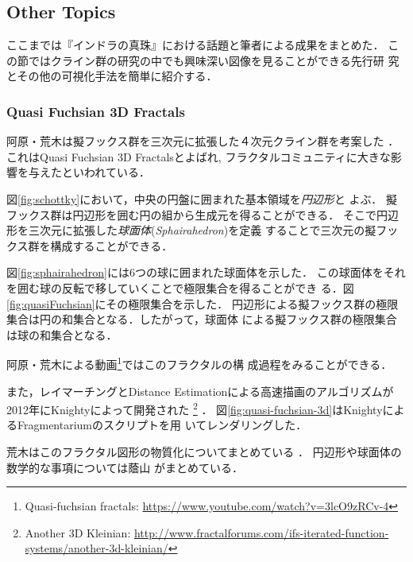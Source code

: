 \subsection{Other Topics}

ここまでは『インドラの真珠』における話題と筆者による成果をまとめた．
この節ではクライン群の研究の中でも興味深い図像を見ることができる先行研
究とその他の可視化手法を簡単に紹介する．

\subsubsection{Quasi Fuchsian 3D Fractals}

阿原・荒木は擬フックス群を三次元に拡張した４次元クライン群を考案した
\cite{ahara2003sphairahedral}\cite{ahara2003sphaira}．
これはQuasi Fuchsian 3D Fractalsとよばれ,
フラクタルコミュニティに大きな影響を与えたといわれている．

図\ref{fig:schottky}において，中央の円盤に囲まれた基本領域を\emph{円辺形}と
よぶ．
擬フックス群は円辺形を囲む円の組から生成元を得ることができる．
そこで円辺形を三次元に拡張した\emph{球面体}(\textit{Sphairahedron})を定義
することで三次元の擬フックス群を構成することができる．

図\ref{fig:sphairahedron}には6つの球に囲まれた球面体を示した．
この球面体をそれを囲む球の反転で移していくことで極限集合を得ることができ
る．図\ref{fig:quasiFuchsian}にその極限集合を示した．
円辺形による擬フックス群の極限集合は円の和集合となる．したがって，球面体
による擬フックス群の極限集合は球の和集合となる．

阿原・荒木による動画\footnote{Quasi-fuchsian fractals:
\url{https://www.youtube.com/watch?v=3lcO9zRCv-4}}ではこのフラクタルの構
成過程をみることができる．

また，レイマーチングとDistance Estimationによる高速描画のアルゴリズムが
2012年にKnightyによって開発された
\footnote{Another 3D Kleinian:
 \url{http://www.fractalforums.com/ifs-iterated-function-systems/another-3d-kleinian/}}
 ．
図\ref{fig:quasi-fuchsian-3d}はKnightyによるFragmentariumのスクリプトを用
いてレンダリングした．


荒木はこのフラクタル図形の物質化についてまとめている
\cite{araki2006materializing}．
円辺形や球面体の数学的な事項については蔭山
がまとめている\cite{kageyama2016masterSphaira}．


